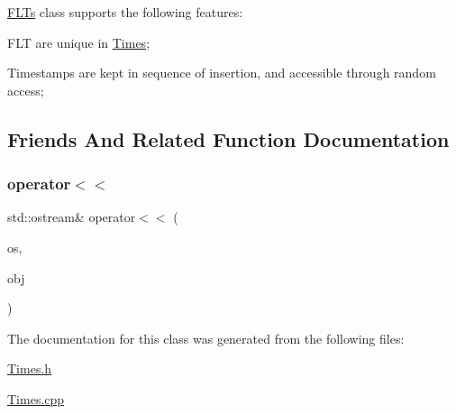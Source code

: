 \mbox{\hyperlink{class_f_l_ts}{F\+L\+Ts}} class supports the following features\+:
\begin{DoxyEnumerate}
\item F\+LT are unique in \mbox{\hyperlink{class_times}{Times}};
\item Timestamps are kept in sequence of insertion, and accessible through random access; 
\end{DoxyEnumerate}

\subsection{Friends And Related Function Documentation}
\mbox{\label{class_f_l_ts_ae6eedde5f18b77e7a2922bc9a3f6b8bf}} 
\subsubsection{\texorpdfstring{operator$<$$<$}{operator<<}}
{\footnotesize\ttfamily std\+::ostream\& operator$<$$<$ (\begin{DoxyParamCaption}\item[{std\+::ostream \&}]{os,  }\item[{\mbox{\hyperlink{class_f_l_ts}{F\+L\+Ts}} const \&}]{obj }\end{DoxyParamCaption})\hspace{0.3cm}{\ttfamily [friend]}}



The documentation for this class was generated from the following files\+:\begin{DoxyCompactItemize}
\item 
\mbox{\hyperlink{_times_8h}{Times.\+h}}\item 
\mbox{\hyperlink{_times_8cpp}{Times.\+cpp}}\end{DoxyCompactItemize}
